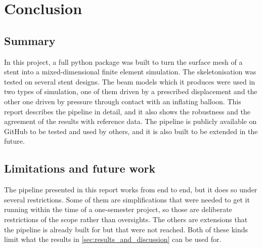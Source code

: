 \section{Conclusion}
\label{sec:conclusion}

\subsection{Summary}
\label{sec:summary}

In this project, a full python package was built to turn the surface mesh of a stent into a mixed-dimensional finite element simulation. The skeletonisation was tested on several stent designs. The beam models which it produces were used in two types of simulation, one of them driven by a prescribed displacement and the other one driven by pressure through contact with an inflating balloon. This report describes the pipeline in detail, and it also shows the robustness and the agreement of the results with reference data. The pipeline is publicly available on GitHub to be tested and used by others, and it is also built to be extended in the future. 

\subsection{Limitations and future work}
\label{sec:limitations_and_future}

The pipeline presented in this report works from end to end, but it does so under several restrictions. Some of them are simplifications that were needed to get it running within the time of a one-semester project, so those are deliberate restrictions of the scope rather than oversights. The others are extensions that the pipeline is already built for but that were not reached. Both of these kinds limit what the results in \cref{sec:results_and_discussion} can be used for.

